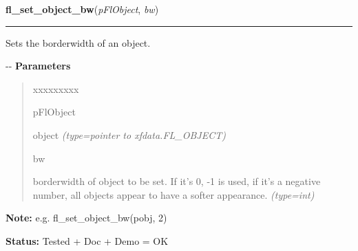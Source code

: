 \hspace{.8\funcindent}\begin{boxedminipage}{\funcwidth}

    \raggedright \textbf{fl\_set\_object\_bw}(\textit{pFlObject}, \textit{bw})

    \vspace{-1.5ex}

    \rule{\textwidth}{0.5\fboxrule}
\setlength{\parskip}{2ex}

Sets the borderwidth of an object.

-{}-
\setlength{\parskip}{1ex}
      \textbf{Parameters}
      \vspace{-1ex}

      \begin{quote}
        \begin{Ventry}{xxxxxxxxx}

          \item[pFlObject]


object
            {\it (type=pointer to xfdata.FL\_OBJECT)}

          \item[bw]


borderwidth of object to be set. If it's 0, -1 is used, if it's a
negative number, all objects appear to have a softer appearance.
            {\it (type=int)}

        \end{Ventry}

      \end{quote}

\textbf{Note:} 
e.g. fl\_set\_object\_bw(pobj, 2)


\textbf{Status:} 
Tested + Doc + Demo = OK


    \end{boxedminipage}

    \label{xformslib:flbasic:fl_get_object_bw}

    \vspace{0.5ex}

